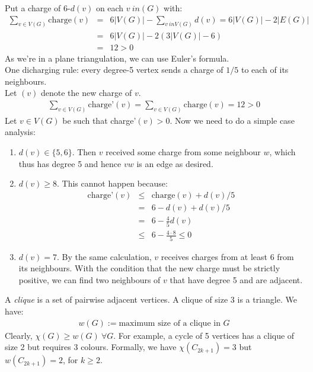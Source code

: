 \documentclass[11pt]{book}
\begin{document}
		Put a charge of 6-$d(v)$ on each $v \ in (G)$ with:
		\begin{eqnarray}
			\sum_{v \in V(G)} \text{charge}(v) &=& 6 |V(G)| - \sum_{v \ in V(G)} d(v) = 6 |V(G)| - 2 |E(G)|\\
			&=& 6 |V(G)| - 2 (3|V(G)| - 6) \\
			&=& 12 > 0
		\end{eqnarray}
		As we're in a plane triangulation, we can use Euler's formula.\\
		
		One dicharging rule: every degree-5 vertex sends  a charge of $1/5$ to each of its neighbours.\\
		
		Let $(v)$ denote the new charge of $v$. 
		\begin{eqnarray}
			\sum_{v \in V(G)} \text{charge'}(v) = \sum_{v \in V(G)} \text{charge}(v) = 12 > 0
		\end{eqnarray}
		Let $v \in V(G)$ be such that charge'$(v) > 0$. Now we need to do a simple case analysis:
		\begin{enumerate}
			\item $d(v) \in \{ 5,  6 \}$. Then $v$ received some charge from some neighbour $w$, which thus has degree 5 and hence $vw$ is an edge as desired.
			\item $d(v) \geq 8$. This cannot happen because:
				\begin{eqnarray}
					\text{charge'}(v) &\leq&  \text{charge}(v) + d(v)/5\\
					&=& 6 - d(v) + d(v)/5\\
					&=& 6 - \frac{4}{5}d(v)\\
					&\leq& 6 - \frac{4 \cdot 8}{5} \leq 0 
				\end{eqnarray}   
			\item $d(v) = 7$. By the same calculation, $v$ receives charges from at least 6 from its neighbours. With the condition that the new charge must be strictly positive, we can find two neighbours of $v$ that have degree 5 and are adjacent.
		\end{enumerate}
		
	A \textit{clique} is a set of pairwise adjacent vertices. A clique of size 3 is a triangle. We have:
	\begin{eqnarray}
		w(G)  := \text{maximum size of a clique in }G
	\end{eqnarray}
	Clearly, $\chi(G) \geq w(G) ~\forall G$. For example, a cycle of 5 vertices has a clique of size 2 but requires 3 colours. Formally, we have $\chi(C_{2k + 1}) = 3$ but $w(C_{2k + 1}) = 2$, for $k \geq 2$.\\
	
\end{document}
